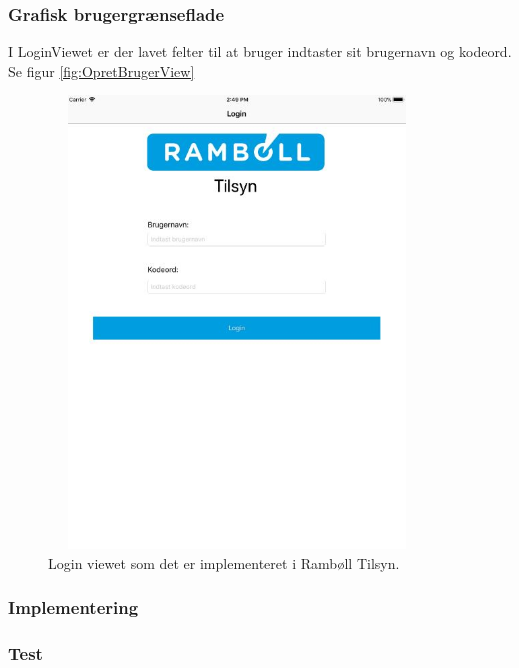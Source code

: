 \subsubsection{Grafisk brugergrænseflade}
I LoginViewet er der lavet felter til at bruger indtaster sit brugernavn og kodeord. Se figur \ref{fig:OpretBrugerView}
\begin{figure}[H] %
	\centering
	\includegraphics[height=12cm, width=10cm]{Design/Applikation/Login/LoginView}
	\caption{Login viewet som det er implementeret i Rambøll Tilsyn.}
	\label{fig:LoginView}
\end{figure}

\subsubsection{Implementering}

\subsubsection{Test}

\clearpage